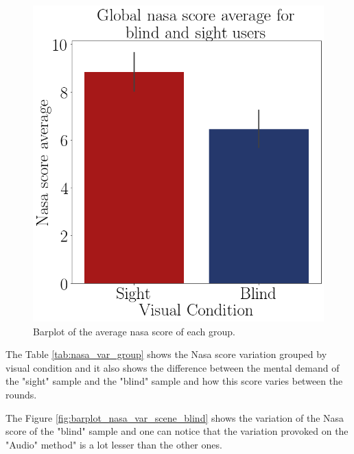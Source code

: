 \begin{figure}[!htb]
\begin{minipage}{.45\linewidth}
        \centering
        \vspace{1.8cm}
        \includegraphics[width = \linewidth]{Resultados/Nasa/Figuras/png/barplot_nasa_avg_global.png}
        \caption{Barplot of the average nasa score of each group.}
        \label{fig:barplot_nasa_global}
    \end{minipage}
\end{figure}

The Table \ref{tab:nasa_var_group} shows the Nasa score variation grouped by visual condition and it also shows the difference between the mental demand of the "sight" sample and the "blind" sample and how this score varies between the rounds.





The Figure \ref{fig:barplot_nasa_var_scene_blind} shows the variation of the Nasa score of the "blind" sample and one can notice that the variation provoked on the "Audio" method" is a lot lesser than the other ones.

